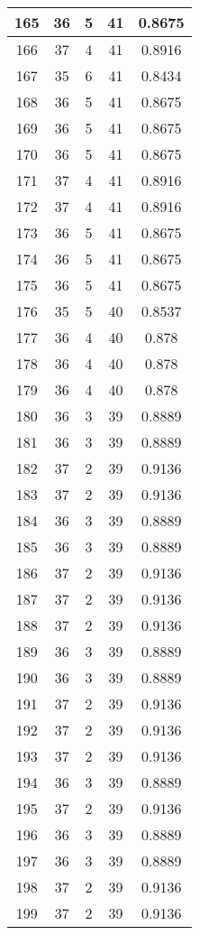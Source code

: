 \documentclass[letterpaper, 12pt]{article}
\begin{document}
\begin{longtable}{|c|c|c|c|c|}
\hline
165 & 36 & 5 & 41 & 0.8675 \\
\hline
166 & 37 & 4 & 41 & 0.8916 \\
\hline
167 & 35 & 6 & 41 & 0.8434 \\
\hline
168 & 36 & 5 & 41 & 0.8675 \\
\hline
169 & 36 & 5 & 41 & 0.8675 \\
\hline
170 & 36 & 5 & 41 & 0.8675 \\
\hline
171 & 37 & 4 & 41 & 0.8916 \\
\hline
172 & 37 & 4 & 41 & 0.8916 \\
\hline
173 & 36 & 5 & 41 & 0.8675 \\
\hline
174 & 36 & 5 & 41 & 0.8675 \\
\hline
175 & 36 & 5 & 41 & 0.8675 \\
\hline
176 & 35 & 5 & 40 & 0.8537 \\
\hline
177 & 36 & 4 & 40 & 0.878 \\
\hline
178 & 36 & 4 & 40 & 0.878 \\
\hline
179 & 36 & 4 & 40 & 0.878 \\
\hline
180 & 36 & 3 & 39 & 0.8889 \\
\hline
181 & 36 & 3 & 39 & 0.8889 \\
\hline
182 & 37 & 2 & 39 & 0.9136 \\
\hline
183 & 37 & 2 & 39 & 0.9136 \\
\hline
184 & 36 & 3 & 39 & 0.8889 \\
\hline
185 & 36 & 3 & 39 & 0.8889 \\
\hline
186 & 37 & 2 & 39 & 0.9136 \\
\hline
187 & 37 & 2 & 39 & 0.9136 \\
\hline
188 & 37 & 2 & 39 & 0.9136 \\
\hline
189 & 36 & 3 & 39 & 0.8889 \\
\hline
190 & 36 & 3 & 39 & 0.8889 \\
\hline
191 & 37 & 2 & 39 & 0.9136 \\
\hline
192 & 37 & 2 & 39 & 0.9136 \\
\hline
193 & 37 & 2 & 39 & 0.9136 \\
\hline
194 & 36 & 3 & 39 & 0.8889 \\
\hline
195 & 37 & 2 & 39 & 0.9136 \\
\hline
196 & 36 & 3 & 39 & 0.8889 \\
\hline
197 & 36 & 3 & 39 & 0.8889 \\
\hline
198 & 37 & 2 & 39 & 0.9136 \\
\hline
199 & 37 & 2 & 39 & 0.9136 \\
\hline
\end{longtable}
\end{document}
